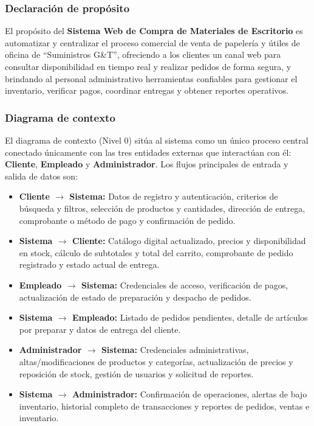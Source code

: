 \subsubsection{Declaración de propósito}
El propósito del \textbf{Sistema Web de Compra de Materiales de Escritorio} es automatizar y centralizar el proceso comercial de venta de papelería y útiles de oficina de ``Suministros G\&T'', ofreciendo a los clientes un canal web para consultar disponibilidad en tiempo real y realizar pedidos de forma segura, y brindando al personal administrativo herramientas confiables para gestionar el inventario, verificar pagos, coordinar entregas y obtener reportes operativos.

\subsubsection{Diagrama de contexto}
El diagrama de contexto (Nivel 0) sitúa al sistema como un único proceso central conectado únicamente con las tres entidades externas que interactúan con él: \textbf{Cliente}, \textbf{Empleado} y \textbf{Administrador}. Los flujos principales de entrada y salida de datos son:
\begin{itemize}
    \item \textbf{Cliente $\rightarrow$ Sistema:} Datos de registro y autenticación, criterios de búsqueda y filtros, selección de productos y cantidades, dirección de entrega, comprobante o método de pago y confirmación de pedido.
    \item \textbf{Sistema $\rightarrow$ Cliente:} Catálogo digital actualizado, precios y disponibilidad en stock, cálculo de subtotales y total del carrito, comprobante de pedido registrado y estado actual de entrega.
    \item \textbf{Empleado $\rightarrow$ Sistema:} Credenciales de acceso, verificación de pagos, actualización de estado de preparación y despacho de pedidos.
    \item \textbf{Sistema $\rightarrow$ Empleado:} Listado de pedidos pendientes, detalle de artículos por preparar y datos de entrega del cliente.
    \item \textbf{Administrador $\rightarrow$ Sistema:} Credenciales administrativas, altas/modificaciones de productos y categorías, actualización de precios y reposición de stock, gestión de usuarios y solicitud de reportes.
    \item \textbf{Sistema $\rightarrow$ Administrador:} Confirmación de operaciones, alertas de bajo inventario, historial completo de transacciones y reportes de pedidos, ventas e inventario.
\end{itemize}

